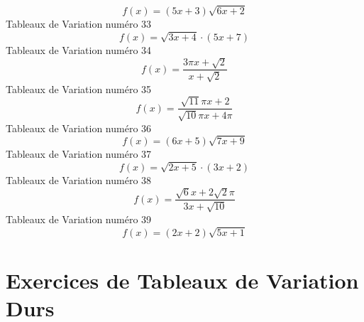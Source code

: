 \documentclass{article}
\begin{document}
\[f(x) = \left(5 x + 3\right) \sqrt{6 x + 2}\]Tableaux de Variation num\'ero 33 \[f(x) = \sqrt{3 x + 4} \cdot \left(5 x + 7\right)\]Tableaux de Variation num\'ero 34 \[f(x) = \frac{3 \pi x + \sqrt{2}}{x + \sqrt{2}}\]Tableaux de Variation num\'ero 35 \[f(x) = \frac{\sqrt{11} \pi x + 2}{\sqrt{10} \pi x + 4 \pi}\]Tableaux de Variation num\'ero 36 \[f(x) = \left(6 x + 5\right) \sqrt{7 x + 9}\]Tableaux de Variation num\'ero 37 \[f(x) = \sqrt{2 x + 5} \cdot \left(3 x + 2\right)\]Tableaux de Variation num\'ero 38 \[f(x) = \frac{\sqrt{6} x + 2 \sqrt{2} \pi}{3 x + \sqrt{10}}\]Tableaux de Variation num\'ero 39 \[f(x) = \left(2 x + 2\right) \sqrt{5 x + 1}\]
 \section{Exercices de Tableaux de Variation Durs}
\end{document}
